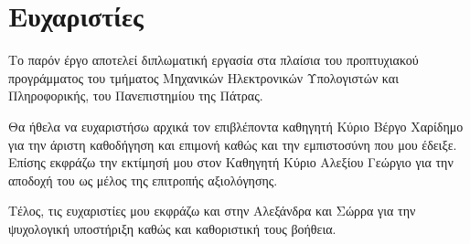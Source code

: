 \section*{Ευχαριστίες}
\thispagestyle{empty}
\begin{spacing}{1.5}
Το παρόν έργο αποτελεί διπλωματική εργασία στα πλαίσια του προπτυχιακού προγράμματος του τμήματος Μηχανικών Ηλεκτρονικών Υπολογιστών και Πληροφορικής, του Πανεπιστημίου της Πάτρας.

Θα ήθελα να ευχαριστήσω αρχικά τον επιβλέποντα καθηγητή Κύριο Βέργο Χαρίδημο για την άριστη καθοδήγηση και επιμονή καθώς και την εμπιστοσύνη που μου έδειξε. Επίσης εκφράζω την εκτίμησή μου στον Καθηγητή Κύριο Αλεξίου Γεώργιο για την αποδοχή του ως μέλος της επιτροπής αξιολόγησης.

Τέλος, τις ευχαριστίες μου εκφράζω και στην Αλεξάνδρα και Σώρρα για την ψυχολογική υποστήριξη καθώς και καθοριστική τους βοήθεια.
\end{spacing}